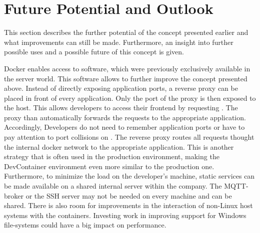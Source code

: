 
\section{Future Potential and Outlook}\label{sec::outlook}
This section describes the further potential of the concept presented earlier and what improvements can still be made. Furthermore, an insight into further possible uses and a possible future of this concept is given.

Docker enables access to software, which were previously exclusively available in the server world. This software allows to further improve the concept presented above. Instead of directly exposing application ports, a reverse proxy can be placed in front of every application. Only the port of the proxy is then exposed to the host. This allows developers to access their frontend by requesting . The proxy than automatically forwards the requests to the appropriate application. Accordingly, Developers do not need to remember application ports or have to pay attention to port collisions on . The reverse proxy routes all requests thought the internal docker network to the appropriate application. This is another strategy that is often used in the production environment, making the DevContainer environment even more similar to the production one. Furthermore, to minimize the load on the developer's machine, static services can be made available on a shared internal server within the company. The MQTT-broker or the \ac{SSH} server may not be needed on every machine and can be shared. There is also room for improvements in the interaction of non-Linux host systems with the containers. Investing work in improving support for Windows file-systems could have a big impact on performance.

